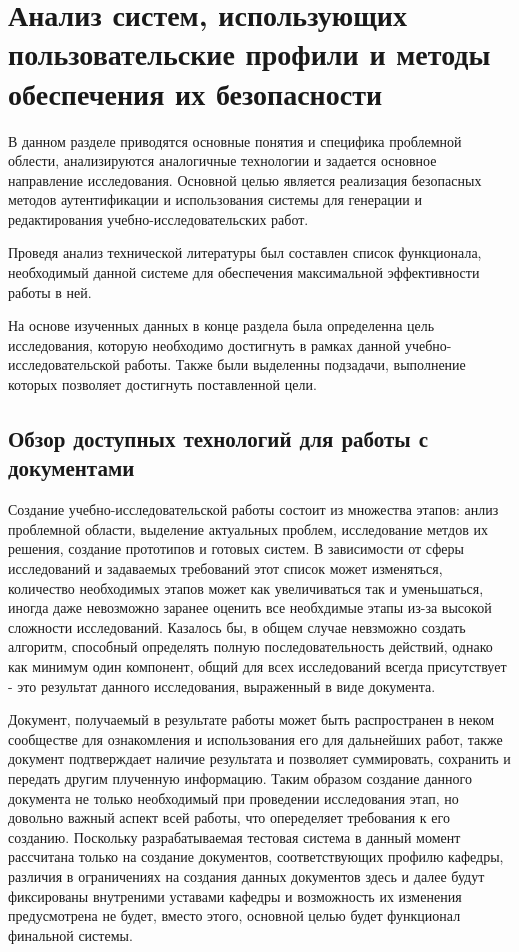 \chapter{Анализ систем, использующих пользовательские профили и методы обеспечения их безопасности}
\label{chapter1}

В данном разделе приводятся основные понятия и специфика проблемной облести, анализируются аналогичные технологии и задается основное направление исследования. Основной целью является реализация безопасных методов аутентификации и использования системы для генерации и редактирования учебно-исследовательских работ.

Проведя анализ технической литературы был составлен список функционала, необходимый данной системе для обеспечения максимальной эффективности работы в ней.

На основе изученных данных в конце раздела была определенна цель исследования,  которую необходимо достигнуть в рамках данной учебно-
исследовательской работы. Также были выделенны подзадачи, выполнение которых позволяет достигнуть поставленной цели.


\section{Обзор доступных технологий для работы с документами}

Создание учебно-исследовательской работы состоит из множества этапов: анлиз проблемной области, выделение актуальных проблем, исследование метдов их решения, создание прототипов и готовых систем. В зависимости от сферы исследований и задаваемых требований этот список может изменяться, количество необходимых этапов может как увеличиваться так и уменьшаться, иногда даже невозможно заранее оценить все необхдимые этапы из-за высокой сложности исследований. Казалось бы, в общем случае невзможно создать алгоритм, способный определять полную последовательность действий, однако как минимум один компонент, общий для всех исследований всегда присутствует - это результат данного исследования, выраженный в виде документа.

Документ, получаемый в результате работы может быть распространен в неком сообществе для ознакомления и использования его для дальнейших работ, также документ подтверждает наличие результата и позволяет суммировать, сохранить и передать другим плученную информацию. Таким образом создание данного документа не только необходимый при проведении исследования этап, но довольно важный аспект всей работы, что опеределяет требования к его созданию. Поскольку разрабатываемая тестовая система в данный момент рассчитана только на создание документов, соответствующих профилю кафедры, различия в ограничениях на создания данных документов здесь и далее будут фиксированы внутреними уставами кафедры и возможность их изменения предусмотрена не будет, вместо этого, основной целью будет функционал финальной системы.

